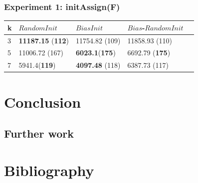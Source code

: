 \documentclass[12pt,a4paper,twoside]{scrartcl}
\numberwithin{equation}{section}
\begin{document}
\subsubsection{Experiment 1: initAssign(F)}
\begin{table}[h!]
\begin{center}
    \begin{tabular}{|l|l|l|l|p{1cm}|}
\hline 
    k &$RandomInit$&$BiasInit$&$Bias$-$RandomInit$ \\ \hline
	3&\textbf{11187.15} (\textbf{112})&11754.82 (109)&11858.93 (110) \\ \hline
	5&11006.72 (167)&\textbf{6023.1}(\textbf{175})&6692.79 (\textbf{175})\\ \hline
	7& 5941.4(\textbf{119})&\textbf{4097.48} (118)&6387.73 (117)\\ \hline
	
\end{tabular}
\end{center}
\end{table} 
\section{Conclusion}
\label{sec:conc}
\subsection{Further work}
\section{Bibliography}


\end{document}
